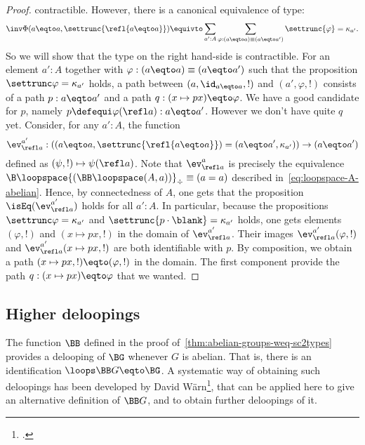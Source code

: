 \begin{proof}
  contractible. However, there is a canonical equivalence of type:
  \begin{displaymath}
    \inv\Phi(a\eqto a,\settrunc{\refl {a\eqto a}}) \equivto \sum_{a':A}
    \sum_{\varphi : (a\eqto a) \equiv (a\eqto a')}\settrunc{\varphi} = \kappa_{a'}.
  \end{displaymath}
  So we will show that the type on the right hand-side is
  contractible. For an element $a':A$ together with
  $\varphi: (a\eqto a) \equiv (a\eqto a')$ such that the proposition
  $\settrunc \varphi = \kappa_{a'}$ holds, a path between
  $(a,\id_{a\eqto a},!)$ and $(a',\varphi,!)$ consists of a path
  $p:a\eqto a'$ and a path $q:(x\mapsto p x) \eqto \varphi$. We have a
  good candidate for $p$, namely $p\defequi \varphi(\refl
  a):a\eqto a'$. However we don't have quite $q$ yet. Consider, for any
  $a':A$, the function
  \begin{displaymath}
    \ev_{\refl a}^{a'} :
    \left(
      (a\eqto a, \settrunc{\refl{a\eqto a}} ) =
      (a\eqto a', \kappa_{a'} )
    \right)
    \to (a\eqto a')
  \end{displaymath}
  defined as $(\psi,!) \mapsto \psi(\refl a)$.  Note that
  $\ev_{\refl a}^{a}$ is precisely the equivalence
  $\B\loopspace{(\BB\loopspace(A,a))}_\div \equiv (a=a)$ described
  in~\cref{eq:loopspace-A-abelian}. Hence, by connectedness of $A$,
  one gets that the proposition $\isEq(\ev_{\refl a}^{a'})$ holds for
  all $a':A$. In particular, because the propositions
  $\settrunc \varphi = \kappa_{a'}$ and
  $\settrunc {p\cdot\blank} = \kappa_{a'}$ holds, one gets elements
  $(\varphi,!)$ and $(x\mapsto px,!)$ in the domain of
  $\ev_{\refl a}^{a'}$. Their images $\ev_{\refl a}^{a'}(\varphi,!)$
  and $\ev_{\refl a}^{a'}(x\mapsto px,!)$ are both identifiable with
  $p$. By composition, we obtain a path
  $(x\mapsto px,!)\eqto (\varphi,!)$ in the domain. The first
  component provide the path $q:(x\mapsto px) \eqto \varphi$ that we
  wanted.
\end{proof}

\subsection{Higher deloopings}

The function $\BB$ defined in the proof
of~\cref{thm:abelian-groups-weq-sc2types} provides a delooping of
$\BG$ whenever $G$ is abelian. That is, there is an identification
$\loops \BB G \eqto \BG$. A systematic way of obtaining such
deloopings has been developed by David W\"{a}rn\footcite{Warn-EM},
that can be applied here to give an alternative definition of $\BB G$,
and to obtain further deloopings of it.

